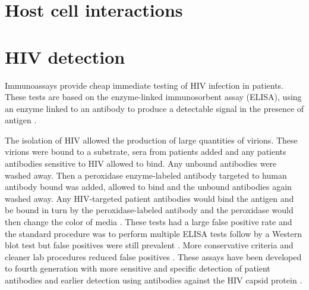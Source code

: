 \documentclass[../sherrill-Mix_thesis.tex]{subfiles}
\begin{document}

\section{Host cell interactions}



\section{HIV detection}
	Immunoassays provide cheap immediate testing of HIV infection in patients. These tests are based on the enzyme-linked immunosorbent assay (ELISA), using an enzyme linked to an antibody to produce a detectable signal in the presence of antigen \citep{Yalow1960,Engvall1971,VanWeemen1971}. %
	
	The isolation of HIV \citep{Barre-Sinoussi1983,Gallo1983,Popovic1984,Levy1984} allowed the production of large quantities of virions. These virions were bound to a substrate, sera from patients added and any patients antibodies sensitive to HIV allowed to bind. Any unbound antibodies were washed away. Then a peroxidase enzyme-labeled antibody targeted to human antibody bound was added, allowed to bind and the unbound antibodies again washed away. Any HIV-targeted patient antibodies would bind the antigen and be bound in turn by the peroxidase-labeled antibody and the peroxidase would then change the color of media \citep{Safai1984,Sarngadharan1984}. These tests had a large false positive rate and the standard procedure was to perform multiple ELISA tests follow by a Western blot test \citep{Towbin1979,CDC1985} but false positives were still prevalent \citep{Burke1986}. More conservative criteria and cleaner lab procedures reduced false positives \citep{Burke1988}. These assays have been developed to fourth generation \citep{Chappel2009} with more sensitive and specific detection of patient antibodies and earlier detection using antibodies against the HIV capsid protein \citep{Weber1998,Weber2002}.  
\end{document}
